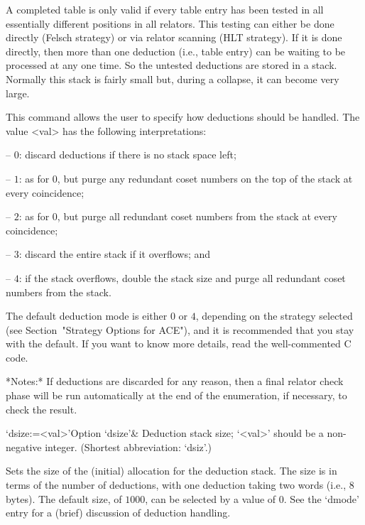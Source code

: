 A completed table  is only valid if every table  entry has been tested
in all essentially different  positions in all relators.  This testing
can either be done directly  (Felsch strategy) or via relator scanning
(HLT strategy).  If it is  done directly, then more than one deduction
(i.e., table  entry) can be waiting  to be processed at  any one time.
So the untested deductions are stored in a stack.  Normally this stack
is fairly small but, during a collapse, it can become very large.

This command allows the user  to  specify  how  deductions  should  be
handled. The value <val> has the following interpretations:

\beginlist

\item{--} $0$:  
discard deductions if there is no stack space left;

\item{--} $1$: 
as for $0$, but purge any redundant coset numbers on the  top  of  the
stack at every coincidence;

\item{--} $2$: 
as for 0, but purge all redundant coset  numbers  from  the  stack  at
every coincidence;

\item{--} $3$:
discard the entire stack if it overflows; and

\item{--} $4$:
if the stack overflows, double the stack size and purge all  redundant
coset numbers from the stack.

\endlist

The default deduction mode is either $0$  or  $4$,  depending  on  the
strategy selected (see Section~"Strategy Options for ACE"), and it  is
recommended that you stay with the default. If you want to  know  more
details, read the well-commented C code.

*Notes:*
If deductions are discarded for any reason, then a final relator check
phase  will be run  automatically at  the end  of the  enumeration, if
necessary, to check the result.

\>`dsize:=<val>'{Option `dsize'}&
Deduction stack size; `<val>' should be a non-negative integer.
(Shortest abbreviation: `dsiz'.)

Sets the  size of  the (initial) allocation  for the  deduction stack.
The size is  in terms of the number of  deductions, with one deduction
taking two words (i.e., 8 bytes).  The default size, of $1000$, can be
selected  by  a value  of  0.   See the  `dmode' entry  for a  (brief)
discussion of deduction handling.

